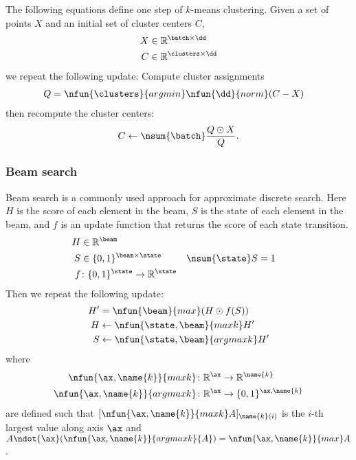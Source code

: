 
The following equations define one step of $k$-means clustering. Given a set of points $X$ and an initial set of cluster centers $C$,
\begin{align*}
  X &\in \reals^{\batch \times \dd} \\
C &\in \reals^{\clusters \times \dd}
\end{align*}
we repeat the following update: Compute cluster assignments
\begin{align*}
Q &= \nfun{\clusters}{argmin} \nfun{\dd}{norm}(C-X)
\end{align*}
then recompute the cluster centers:
\begin{equation*}
C \leftarrow \nsum{\batch} \frac{Q \odot X}{Q}.
\end{equation*}

\subsubsection{Beam search}


Beam search is a commonly used approach for approximate discrete search. Here $H$ is the score of each element in the beam, $S$ is the state of each element in the beam, and $f$ is an update function that returns the score of each state transition. 
\begin{align*} 
H &\in \reals^{\beam} \\
S &\in \{0, 1\}^{\beam \times \state} & \nsum{\state} S &= 1 \\
f &\colon \{0, 1\}^{\state} \rightarrow \reals^{\state} \\
\end{align*}
Then we repeat the following update:
\begin{align*}
H' &= \nfun{\beam}{max} (H \odot f(S)) \\
H &\leftarrow \nfun{\state,\beam}{maxk} H' \\
S &\leftarrow \nfun{\state,\beam}{argmaxk} H'
\end{align*}
where
\begin{align*}
\nfun{\ax,\name{k}}{maxk} \colon \reals^{\ax} &\rightarrow \reals^{\name{k}} \\
\nfun{\ax,\name{k}}{argmaxk} \colon \reals^{\ax} &\rightarrow \{0,1\}^{\ax,\name{k}}
\end{align*}
are defined such that $[\nfun{\ax,\name{k}}{maxk} A]_{\name{k}(i)}$ is the $i$-th largest value along axis $\ax$ and $A \ndot{\ax} (\nfun{\ax,\name{k}}{argmaxk}{A}) = \nfun{\ax,\name{k}}{max} A$.

